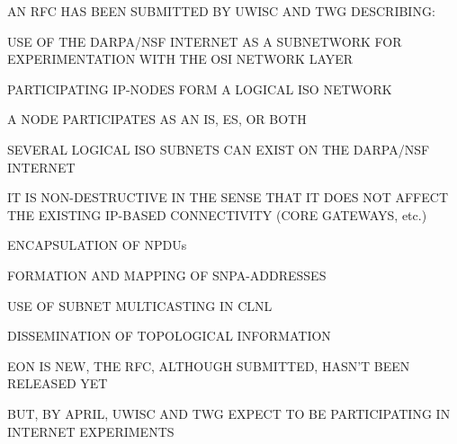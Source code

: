 \begin{bwslide}

\begin{nrtc}
\item	AN RFC HAS BEEN SUBMITTED BY UWISC AND TWG DESCRIBING:
    \begin{nrtc}\em
    \item	USE OF THE DARPA/NSF INTERNET AS A SUBNETWORK FOR
		EXPERIMENTATION WITH THE OSI NETWORK LAYER
    \end{nrtc}

\item	PARTICIPATING IP-NODES FORM A LOGICAL ISO NETWORK
    \begin{nrtc}
    \item	A NODE PARTICIPATES AS AN IS, ES, OR BOTH

    \item	SEVERAL LOGICAL ISO SUBNETS CAN EXIST ON THE DARPA/NSF INTERNET
    \end{nrtc}

\item	IT IS NON-DESTRUCTIVE IN THE SENSE THAT IT DOES NOT AFFECT THE
	EXISTING IP-BASED CONNECTIVITY (CORE GATEWAYS, etc.)
\end{nrtc}
\end{bwslide}


\begin{bwslide}

\begin{nrtc}
\item	ENCAPSULATION OF NPDUs

\item	FORMATION AND MAPPING OF SNPA-ADDRESSES

\item	USE OF SUBNET MULTICASTING IN CLNL

\item	DISSEMINATION OF TOPOLOGICAL INFORMATION	
\end{nrtc}
\end{bwslide}


\begin{bwslide}

\begin{nrtc}
\item	EON IS NEW, THE RFC, ALTHOUGH SUBMITTED, HASN'T BEEN RELEASED YET
	
\item	BUT, BY APRIL, UWISC AND TWG EXPECT TO BE PARTICIPATING IN INTERNET
	EXPERIMENTS
\end{nrtc}
\end{bwslide}



